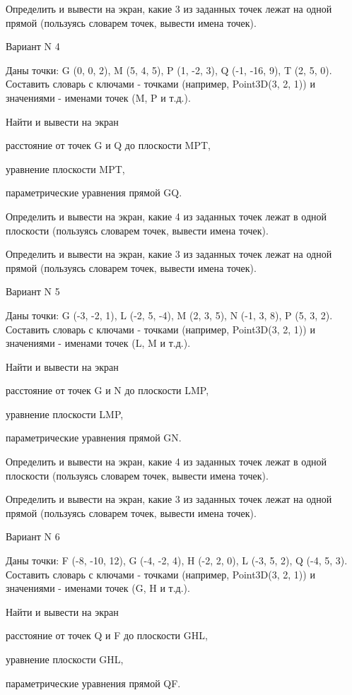 \documentclass[11pt]{report}
\begin{document}
Определить и вывести на экран, какие 3 из заданных точек лежат на одной прямой (пользуясь словарем точек, вывести имена точек).

Вариант N 4

Даны точки: G (0, 0, 2), M (5, 4, 5), P (1, -2, 3), Q (-1, -16, 9), T (2, 5, 0).
Составить словарь с ключами - точками (например, Point3D(3, 2, 1)) и значениями - именами точек (M, P и т.д.).

 
Найти и вывести на экран


расстояние от точек G и Q до плоскости MPT,

 
уравнение плоскости MPT,

 
параметрические уравнения прямой GQ.


Определить и вывести на экран, какие 4 из заданных точек лежат в одной плоскости (пользуясь словарем точек, вывести имена точек).


Определить и вывести на экран, какие 3 из заданных точек лежат на одной прямой (пользуясь словарем точек, вывести имена точек).

Вариант N 5

Даны точки: G (-3, -2, 1), L (-2, 5, -4), M (2, 3, 5), N (-1, 3, 8), P (5, 3, 2).
Составить словарь с ключами - точками (например, Point3D(3, 2, 1)) и значениями - именами точек (L, M и т.д.).

 
Найти и вывести на экран


расстояние от точек G и N до плоскости LMP,

 
уравнение плоскости LMP,

 
параметрические уравнения прямой GN.


Определить и вывести на экран, какие 4 из заданных точек лежат в одной плоскости (пользуясь словарем точек, вывести имена точек).


Определить и вывести на экран, какие 3 из заданных точек лежат на одной прямой (пользуясь словарем точек, вывести имена точек).

Вариант N 6

Даны точки: F (-8, -10, 12), G (-4, -2, 4), H (-2, 2, 0), L (-3, 5, 2), Q (-4, 5, 3).
Составить словарь с ключами - точками (например, Point3D(3, 2, 1)) и значениями - именами точек (G, H и т.д.).

 
Найти и вывести на экран


расстояние от точек Q и F до плоскости GHL,

 
уравнение плоскости GHL,

 
параметрические уравнения прямой QF.
\end{document}
